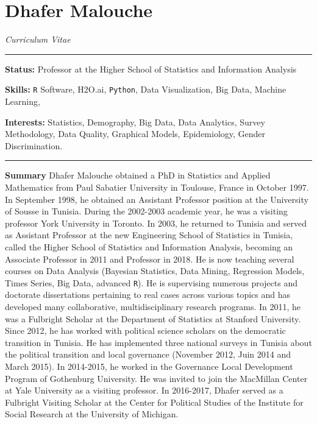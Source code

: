 \documentclass[]{article}
\title{}
\author{}
\date{}
\begin{document}
\section{Dhafer Malouche}\label{dhafer-malouche}

\emph{Curriculum Vitae}

\begin{center}\rule{0.5\linewidth}{\linethickness}\end{center}

\textbf{Status:} Professor at the Higher School of Statistics and
Information Analysis

\textbf{Skills:} \texttt{R} Software, H2O.ai, \texttt{Python}, Data
Visualization, Big Data, Machine Learning,

\textbf{Interests:} Statistics, Demography, Big Data, Data Analytics,
Survey Methodology, Data Quality, Graphical Models, Epidemiology, Gender
Discrimination.

\begin{center}\rule{0.5\linewidth}{\linethickness}\end{center}

\textbf{Summary} Dhafer Malouche obtained a PhD in Statistics and
Applied Mathematics from Paul Sabatier University in Toulouse, France in
October 1997. In September 1998, he obtained an Assistant Professor
position at the University of Sousse in Tunisia. During the 2002-2003
academic year, he was a visiting professor York University in Toronto.
In 2003, he returned to Tunisia and served as Assistant Professor at the
new Engineering School of Statistics in Tunisia, called the Higher
School of Statistics and Information Analysis, becoming an Associate
Professor in 2011 and Professor in 2018. He is now teaching several
courses on Data Analysis (Bayesian Statistics, Data Mining, Regression
Models, Times Series, Big Data, advanced \texttt{R}). He is supervising
numerous projects and doctorate dissertations pertaining to real cases
across various topics and has developed many collaborative,
multidisciplinary research programs. In 2011, he was a Fulbright Scholar
at the Department of Statistics at Stanford University. Since 2012, he
has worked with political science scholars on the democratic transition
in Tunisia. He has implemented three national surveys in Tunisia about
the political transition and local governance (November 2012, Juin 2014
and March 2015). In 2014-2015, he worked in the Governance Local
Development Program of Gothenburg University. He was invited to join the
MacMillan Center at Yale University as a visiting professor. In
2016-2017, Dhafer served as a Fulbright Visiting Scholar at the Center
for Political Studies of the Institute for Social Research at the
University of Michigan.
\end{document}
